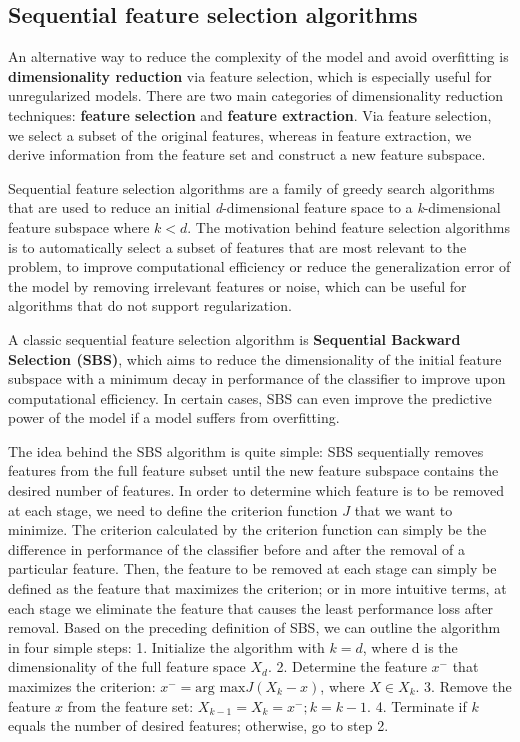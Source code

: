 \documentclass[11pt]{article}
\begin{document}
    \subsection{Sequential feature selection
algorithms}\label{sequential-feature-selection-algorithms}

    An alternative way to reduce the complexity of the model and avoid
overfitting is \textbf{dimensionality reduction} via feature selection,
which is especially useful for unregularized models. There are two main
categories of dimensionality reduction techniques: \textbf{feature
selection} and \textbf{feature extraction}. Via feature selection, we
select a subset of the original features, whereas in feature extraction,
we derive information from the feature set and construct a new feature
subspace.

Sequential feature selection algorithms are a family of greedy search
algorithms that are used to reduce an initial \emph{d}-dimensional
feature space to a \emph{k}-dimensional feature subspace where \(k<d\).
The motivation behind feature selection algorithms is to automatically
select a subset of features that are most relevant to the problem, to
improve computational efficiency or reduce the generalization error of
the model by removing irrelevant features or noise, which can be useful
for algorithms that do not support regularization.

A classic sequential feature selection algorithm is \textbf{Sequential
Backward Selection (SBS)}, which aims to reduce the dimensionality of
the initial feature subspace with a minimum decay in performance of the
classifier to improve upon computational efficiency. In certain cases,
SBS can even improve the predictive power of the model if a model
suffers from overfitting.

The idea behind the SBS algorithm is quite simple: SBS sequentially
removes features from the full feature subset until the new feature
subspace contains the desired number of features. In order to determine
which feature is to be removed at each stage, we need to define the
criterion function \(J\) that we want to minimize. The criterion
calculated by the criterion function can simply be the difference in
performance of the classifier before and after the removal of a
particular feature. Then, the feature to be removed at each stage can
simply be defined as the feature that maximizes the criterion; or in
more intuitive terms, at each stage we eliminate the feature that causes
the least performance loss after removal. Based on the preceding
definition of SBS, we can outline the algorithm in four simple steps: 1.
Initialize the algorithm with \(k=d\), where d is the dimensionality of
the full feature space \(X_d\). 2. Determine the feature \(x^-\) that
maximizes the criterion: \(x^- = \text{arg max} J(X_k - x)\), where
\(X \in X_k\). 3. Remove the feature \(x\) from the feature set:
\(X_{k-1} = X_k = x^-; k = k - 1\). 4. Terminate if \(k\) equals the
number of desired features; otherwise, go to step 2.
\end{document}
